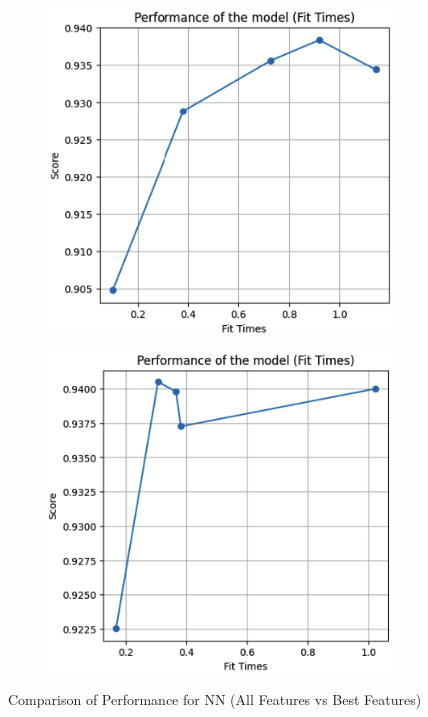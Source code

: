 \documentclass[conference]{IEEEtran}
\begin{document}
\begin{figure}[H]
    \centering
    \begin{subfigure}[b]{0.45\linewidth}
        \centering
        \includegraphics[width=\linewidth]{images/PerformanceNNAllFeatures.png}
        \label{fig:performance-all}
    \end{subfigure}
    \hfill
    \begin{subfigure}[b]{0.45\linewidth}
        \centering
        \includegraphics[width=\linewidth]{images/PerformanceNNBestFeatures.png}
        \label{fig:performance-best}
    \end{subfigure}
    \caption{Comparison of Performance for NN (All Features vs Best Features)}
    \label{fig:performance-comparison}
\end{figure}
\end{document}
